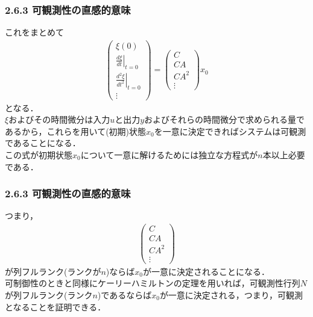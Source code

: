 \begin{frame}[t]
\frametitle{2.6.3 可観測性の直感的意味}
これをまとめて
\begin{align}
 \left( 
    \begin{array}{c}
       \xi(0) \\
       \left . \frac{d \xi}{dt} \right \vert_{t=0} \\
       \left . \frac{d^2 \xi}{dt^2} \right \vert_{t=0}\\
       \vdots
    \end{array}
 \right)
 =
 \left( 
    \begin{array}{c}
       C \\
       C A \\
       C A^2 \\
       \vdots
    \end{array}
 \right)
 x_0
\end{align}
となる．
\\[3mm]

$\xi$およびその時間微分は入力$u$と出力$y$およびそれらの時間微分で求められる量であるから，これらを用いて(初期)状態$x_0$を一意に決定できればシステムは可観測であることになる．
\\[3mm]

この式が初期状態$x_0$について一意に解けるためには独立な方程式が$n$本以上必要である．
\end{frame}

\begin{frame}[t]
\frametitle{2.6.3 可観測性の直感的意味}
つまり，
\begin{align}
 \left( 
    \begin{array}{c}
       C \\
       C A \\
       C A^2 \\
       \vdots
    \end{array}
 \right)
\end{align}
が列フルランク(ランクが$n$)ならば$x_0$が一意に決定されることになる．
\\[3mm]

可制御性のときと同様にケーリーハミルトンの定理を用いれば，可観測性行列$N$が列フルランク(ランク$n$)であるならば$x_0$が一意に決定される，つまり，可観測となることを証明できる．

\end{frame}

